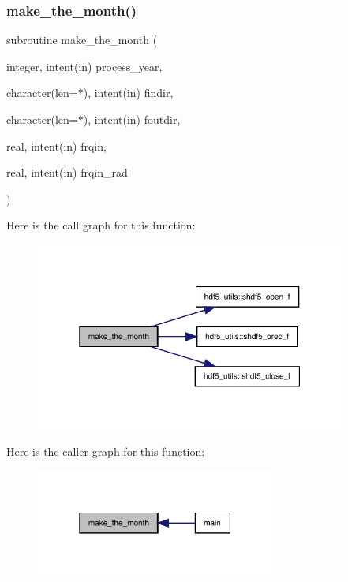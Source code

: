 \subsubsection{\texorpdfstring{make\+\_\+the\+\_\+month()}{make\_the\_month()}}
{\footnotesize\ttfamily subroutine make\+\_\+the\+\_\+month (\begin{DoxyParamCaption}\item[{integer, intent(in)}]{process\+\_\+year,  }\item[{character(len=$\ast$), intent(in)}]{findir,  }\item[{character(len=$\ast$), intent(in)}]{foutdir,  }\item[{real, intent(in)}]{frqin,  }\item[{real, intent(in)}]{frqin\+\_\+rad }\end{DoxyParamCaption})}

Here is the call graph for this function\+:
\nopagebreak
\begin{figure}[H]
\begin{center}
\leavevmode
\includegraphics[width=289pt]{convert__ascii_8f90_a4c40e1c4ea890a51cd138db74efd2c6c_cgraph}
\end{center}
\end{figure}
Here is the caller graph for this function\+:
\nopagebreak
\begin{figure}[H]
\begin{center}
\leavevmode
\includegraphics[width=223pt]{convert__ascii_8f90_a4c40e1c4ea890a51cd138db74efd2c6c_icgraph}
\end{center}
\end{figure}
